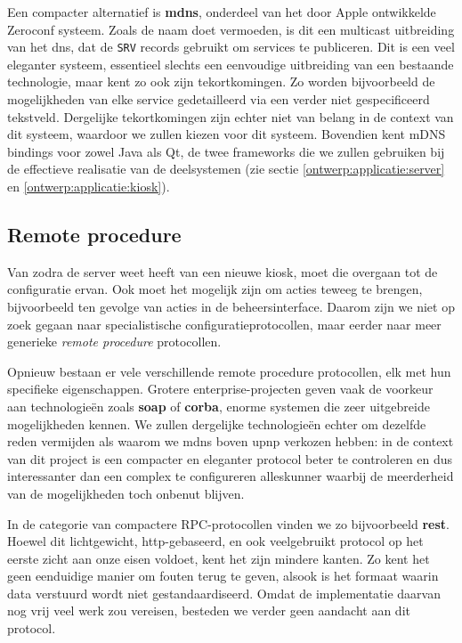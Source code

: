 Een compacter alternatief is \textbf{\ac{mdns}}, onderdeel van het door Apple ontwikkelde Zeroconf systeem. Zoals de naam doet vermoeden, is dit een multicast uitbreiding van het \ac{dns}, dat de \texttt{SRV} records gebruikt om services te publiceren. Dit is een veel eleganter systeem, essentieel slechts een eenvoudige uitbreiding van een bestaande technologie, maar kent zo ook zijn tekortkomingen. Zo worden bijvoorbeeld de mogelijkheden van elke service gedetailleerd via een verder niet gespecificeerd tekstveld. Dergelijke tekortkomingen zijn echter niet van belang in de context van dit systeem, waardoor we zullen kiezen voor dit systeem. Bovendien kent mDNS bindings voor zowel Java als Qt, de twee frameworks die we zullen gebruiken bij de effectieve realisatie van de deelsystemen (zie sectie \ref{ontwerp:applicatie:server} en \ref{ontwerp:applicatie:kiosk}).

\subsection{Remote procedure}

Van zodra de server weet heeft van een nieuwe kiosk, moet die overgaan tot de configuratie ervan. Ook moet het mogelijk zijn om acties teweeg te brengen, bijvoorbeeld ten gevolge van acties in de beheersinterface. Daarom zijn we niet op zoek gegaan naar specialistische configuratieprotocollen, maar eerder naar meer generieke \emph{remote procedure} protocollen.

Opnieuw bestaan er vele verschillende remote procedure protocollen, elk met hun specifieke eigenschappen. Grotere enterprise-projecten geven vaak de voorkeur aan technologieën zoals \textbf{\ac{soap}} of \textbf{\ac{corba}}, enorme systemen die zeer uitgebreide mogelijkheden kennen. We zullen dergelijke technologieën echter om dezelfde reden vermijden als waarom we \ac{mdns} boven \ac{upnp} verkozen hebben: in de context van dit project is een compacter en eleganter protocol beter te controleren en dus interessanter dan een complex te configureren alleskunner waarbij de meerderheid van de mogelijkheden toch onbenut blijven.

In de categorie van compactere RPC-protocollen vinden we zo bijvoorbeeld \textbf{\ac{rest}}. Hoewel dit lichtgewicht, \ac{http}-gebaseerd, en ook veelgebruikt protocol op het eerste zicht aan onze eisen voldoet, kent het zijn mindere kanten. Zo kent het geen eenduidige manier om fouten terug te geven, alsook is het formaat waarin data verstuurd wordt niet gestandaardiseerd. Omdat de implementatie daarvan nog vrij veel werk zou vereisen, besteden we verder geen aandacht aan dit protocol.

